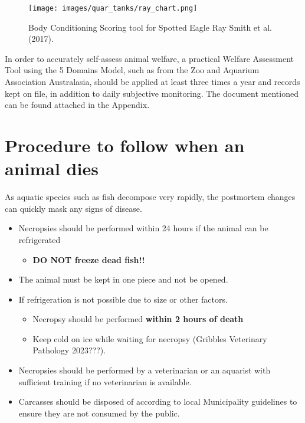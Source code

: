 \documentclass[
  letterpaper,
  DIV=11,
  numbers=noendperiod]{scrreprt}
\providecommand{\tightlist}{%
  \setlength{\itemsep}{0pt}\setlength{\parskip}{0pt}}\usepackage{longtable,booktabs,array}
\begin{document}
\begin{figure}[H]

{\centering \texttt{[image: images/quar\_tanks/ray\_chart.png]}

}

\caption{\label{fig-raychart}Body Conditioning Scoring tool for Spotted
Eagle Ray Smith et al. (2017).}

\end{figure}

In order to accurately self-assess animal welfare, a practical Welfare
Assessment Tool using the 5 Domains Model, such as from the Zoo and
Aquarium Association Australasia, should be applied at least three times
a year and records kept on file, in addition to daily subjective
monitoring. The document mentioned can be found attached in the
Appendix.

\hypertarget{procedure-to-follow-when-an-animal-dies}{%
\section{Procedure to follow when an animal
dies}\label{procedure-to-follow-when-an-animal-dies}}

As aquatic species such as fish decompose very rapidly, the postmortem
changes can quickly mask any signs of disease.

\begin{itemize}
\tightlist
\item
  Necropsies should be performed within 24 hours if the animal can be
  refrigerated

  \begin{itemize}
  \tightlist
  \item
    \textbf{DO NOT freeze dead fish!!}
  \end{itemize}
\item
  The animal must be kept in one piece and not be opened.
\item
  If refrigeration is not possible due to size or other factors.

  \begin{itemize}
  \tightlist
  \item
    Necropsy should be performed \textbf{within 2 hours of death}
  \item
    Keep cold on ice while waiting for necropsy (Gribbles Veterinary
    Pathology 2023???).
  \end{itemize}
\item
  Necropsies should be performed by a veterinarian or an aquarist with
  sufficient training if no veterinarian is available.
\item
  Carcasses should be disposed of according to local Municipality
  guidelines to ensure they are not consumed by the public.
\end{itemize}
\end{document}
